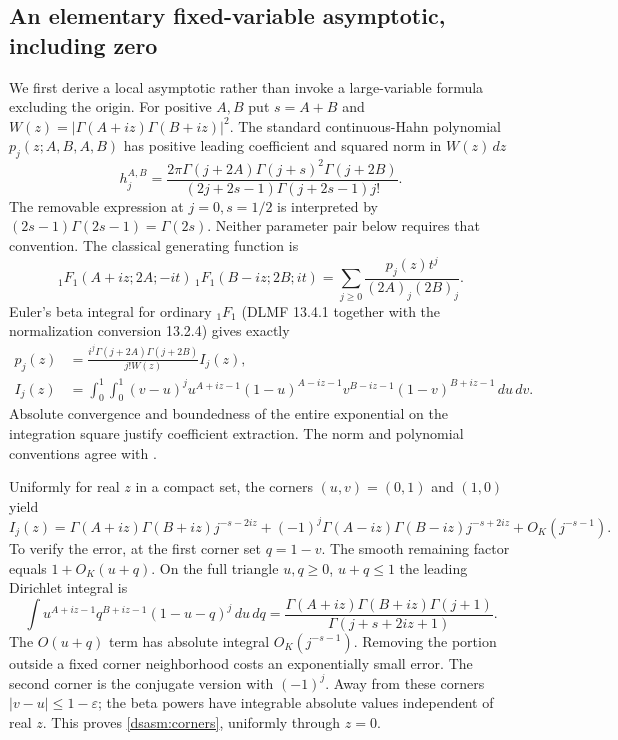 \documentclass[11pt,letterpaper]{article}
\theoremstyle{remark}\newtheorem{remark}[theorem]{Remark}
\newcommand{\eps}{\varepsilon}\newcommand{\HH}{\mathcal H}\newcommand{\one}{\mathbf1}
\begin{document}
\subsection{An elementary fixed-variable asymptotic, including zero}
We first derive a local asymptotic rather than invoke a large-variable
formula excluding the origin. For positive $A,B$ put $s=A+B$ and
$W(z)=|\Gamma(A+iz)\Gamma(B+iz)|^2$.
The standard continuous-Hahn polynomial $p_j(z;A,B,A,B)$ has positive
leading coefficient and squared norm in $W(z)\,dz$
\begin{equation}\label{dsasm:Hahnnorm}
 h_j^{A,B}=\frac{2\pi\Gamma(j+2A)\Gamma(j+s)^2\Gamma(j+2B)}
              {(2j+2s-1)\Gamma(j+2s-1)j!}.
\end{equation}
The removable expression at $j=0,s=1/2$ is interpreted by
$(2s-1)\Gamma(2s-1)=\Gamma(2s)$. Neither parameter pair below
requires that convention. The classical generating function
\cite[DLMF 18.23.6]{dlmf} is
\[
 {}_1F_1(A+iz;2A;-it)\,{}_1F_1(B-iz;2B;it)
       =\sum_{j\ge0}\frac{p_j(z)t^j}{(2A)_j(2B)_j}.
\]
Euler's beta integral for ordinary ${}_1F_1$ (DLMF 13.4.1 together
with the normalization conversion 13.2.4) gives exactly
\begin{align}
 p_j(z)&=\frac{i^j\Gamma(j+2A)\Gamma(j+2B)}{j!W(z)}I_j(z),
 \label{dsasm:Hahnbeta}\\
 I_j(z)&=\int_0^1\!\int_0^1(v-u)^j
 u^{A+iz-1}(1-u)^{A-iz-1}
 v^{B-iz-1}(1-v)^{B+iz-1}\,du\,dv.\nonumber
\end{align}
Absolute convergence and boundedness of the entire exponential on
the integration square justify coefficient extraction. The norm
and polynomial conventions agree with \cite[Equations (1.1)--(1.4)]{cll}.

Uniformly for real $z$ in a compact set, the corners $(u,v)=(0,1)$
and $(1,0)$ yield
\begin{equation}\label{dsasm:corners}
 I_j(z)=\Gamma(A+iz)\Gamma(B+iz)j^{-s-2iz}
  +(-1)^j\Gamma(A-iz)\Gamma(B-iz)j^{-s+2iz}+O_K(j^{-s-1}).
\end{equation}
To verify the error, at the first corner set $q=1-v$. The smooth
remaining factor equals $1+O_K(u+q)$. On the full triangle
$u,q\ge0$, $u+q\le1$ the leading Dirichlet integral is
\[
 \int u^{A+iz-1}q^{B+iz-1}(1-u-q)^j\,du\,dq
 =\frac{\Gamma(A+iz)\Gamma(B+iz)\Gamma(j+1)}
        {\Gamma(j+s+2iz+1)}.
\]
The $O(u+q)$ term has absolute integral $O_K(j^{-s-1})$.
Removing the portion outside a fixed corner neighborhood costs an
exponentially small error. The second corner is the conjugate version
with $(-1)^j$. Away from these corners $|v-u|\le1-\eps$; the beta
powers have integrable absolute values independent of real $z$.
This proves \eqref{dsasm:corners}, uniformly through $z=0$.
\end{document}
